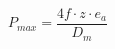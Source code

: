 \documentclass[12pt]{article}
\begin{document}
\begin{displaymath}
P_{max} = \frac {4f \cdot z \cdot e_a} {D_m}
\end{displaymath}
\end{document}
